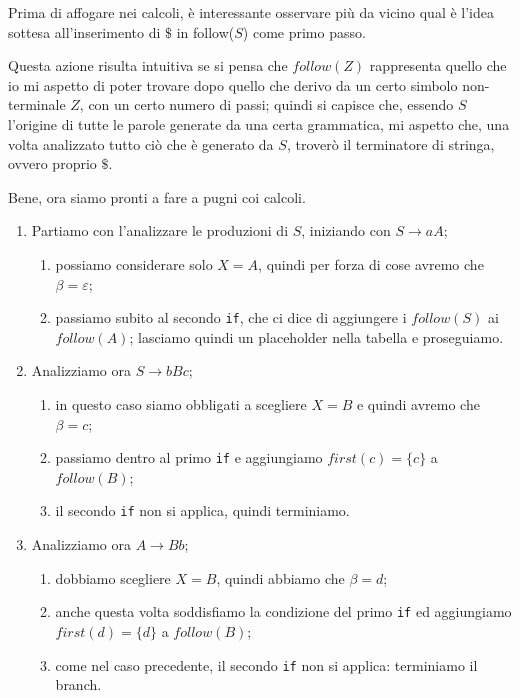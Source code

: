 \documentclass[class=book, crop=false, oneside, 12pt]{standalone}
\begin{document}
Prima di affogare nei calcoli, è interessante osservare più da vicino qual è l’idea sottesa all'inserimento di \(\$\) in follow(\(S\)) come primo passo.

Questa azione risulta intuitiva se si pensa che \(follow(Z)\) rappresenta quello che io mi aspetto di poter trovare dopo quello che derivo da un certo simbolo non-terminale \(Z\), con un certo numero di passi; quindi si capisce che, essendo \(S\) l’origine di tutte le parole generate da una certa grammatica, mi aspetto che, una volta analizzato tutto ciò che è generato da \(S\), troverò il terminatore di stringa, ovvero proprio \(\$\).

\noindent Bene, ora siamo pronti a fare a pugni coi calcoli.

\begin{enumerate}
    \item Partiamo con l’analizzare le produzioni di \(S\), iniziando con \(S \to aA\);
    \begin{enumerate}
        \item possiamo considerare solo \(X = A\), quindi per forza di cose avremo che \(\beta = \varepsilon\);
        \item passiamo subito al secondo \texttt{if}, che ci dice di aggiungere i \(follow(S)\) ai \(follow(A)\); lasciamo quindi un placeholder nella tabella e proseguiamo.
    \end{enumerate}
    \item Analizziamo ora \(S \to bBc\);
    \begin{enumerate}
        \item in questo caso siamo obbligati a scegliere \(X = B\) e quindi avremo che \(\beta = c\);
        \item passiamo dentro al primo \texttt{if} e aggiungiamo \(first(c) = \{c\}\) a \(follow(B)\);
        \item il secondo \texttt{if} non si applica, quindi terminiamo.
    \end{enumerate}
    \item Analizziamo ora \(A \to Bb\);
    \begin{enumerate}
        \item dobbiamo scegliere \(X = B\), quindi abbiamo che \(\beta = d\);
        \item anche questa volta soddisfiamo la condizione del primo \texttt{if} ed aggiungiamo \(first(d)= \{d\}\) a \(follow(B)\);
        \item come nel caso precedente, il secondo \texttt{if} non si applica: terminiamo il branch.

\end{enumerate}
\end{enumerate}
\end{document}
